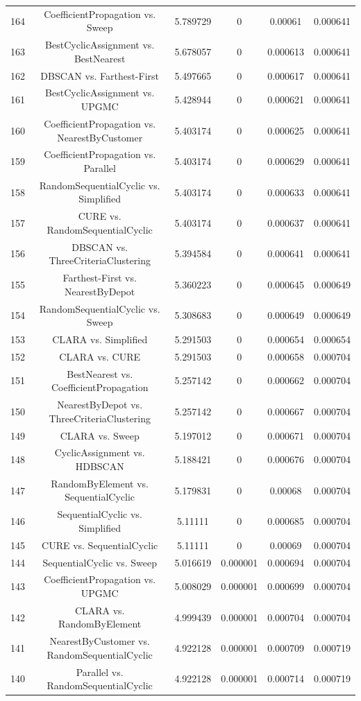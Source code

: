 \documentclass[a4paper,10pt]{article}
\begin{document}
\begin{landscape}
\begin{table}[!htp]
\begin{tabular}{cccccc}
164&CoefficientPropagation vs. Sweep&5.789729&0&0.00061&0.000641\\
163&BestCyclicAssignment vs. BestNearest&5.678057&0&0.000613&0.000641\\
162&DBSCAN vs. Farthest-First&5.497665&0&0.000617&0.000641\\
161&BestCyclicAssignment vs. UPGMC&5.428944&0&0.000621&0.000641\\
160&CoefficientPropagation vs. NearestByCustomer&5.403174&0&0.000625&0.000641\\
159&CoefficientPropagation vs. Parallel&5.403174&0&0.000629&0.000641\\
158&RandomSequentialCyclic vs. Simplified&5.403174&0&0.000633&0.000641\\
157&CURE vs. RandomSequentialCyclic&5.403174&0&0.000637&0.000641\\
156&DBSCAN vs. ThreeCriteriaClustering&5.394584&0&0.000641&0.000641\\
155&Farthest-First vs. NearestByDepot&5.360223&0&0.000645&0.000649\\
154&RandomSequentialCyclic vs. Sweep&5.308683&0&0.000649&0.000649\\
153&CLARA vs. Simplified&5.291503&0&0.000654&0.000654\\
152&CLARA vs. CURE&5.291503&0&0.000658&0.000704\\
151&BestNearest vs. CoefficientPropagation&5.257142&0&0.000662&0.000704\\
150&NearestByDepot vs. ThreeCriteriaClustering&5.257142&0&0.000667&0.000704\\
149&CLARA vs. Sweep&5.197012&0&0.000671&0.000704\\
148&CyclicAssignment vs. HDBSCAN&5.188421&0&0.000676&0.000704\\
147&RandomByElement vs. SequentialCyclic&5.179831&0&0.00068&0.000704\\
146&SequentialCyclic vs. Simplified&5.11111&0&0.000685&0.000704\\
145&CURE vs. SequentialCyclic&5.11111&0&0.00069&0.000704\\
144&SequentialCyclic vs. Sweep&5.016619&0.000001&0.000694&0.000704\\
143&CoefficientPropagation vs. UPGMC&5.008029&0.000001&0.000699&0.000704\\
142&CLARA vs. RandomByElement&4.999439&0.000001&0.000704&0.000704\\
141&NearestByCustomer vs. RandomSequentialCyclic&4.922128&0.000001&0.000709&0.000719\\
140&Parallel vs. RandomSequentialCyclic&4.922128&0.000001&0.000714&0.000719\\

\end{tabular}
\end{table}
\end{landscape}
\end{document}
